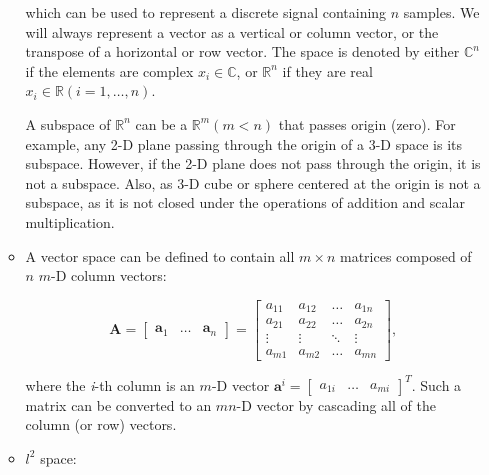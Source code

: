 \documentclass[10pt,b5paper,titlepage]{book}
\begin{document}
\begin{itemize}
\begin{itemize}
                which can be used to represent a discrete signal containing
                $n$ samples. We will always represent a vector as a vertical
                or column vector, or the transpose of a horizontal or row
                vector. The space is denoted by either $\mathbb{C}^{n}$ if the elements
                are complex $x_{i} \in \mathbb{C}$, or $\mathbb{R}^{n}$ if they
                are real $x_{i} \in \mathbb{R} (i = 1, \ldots, n)$.

                A subspace of $\mathbb{R}^{n}$ can be a $\mathbb{R}^{m} (m < n)$
                that passes origin (zero). For example, any 2-D plane passing
                through the origin of a 3-D space is its subspace. However, if
                the 2-D plane does not pass through the origin, it is not a subspace.
                Also, as 3-D cube or sphere centered at the origin is not a subspace,
                as it is not closed under the operations of addition and scalar
                multiplication.

            \item A vector space can be defined to contain all $m \times n$ matrices
                composed of $n$ $m$-D column vectors:

                \begin{equation}
                    \mathbf{A} = \begin{bmatrix} \mathbf{a}_1 & \ldots & \mathbf{a}_n \end{bmatrix}
                    = \begin{bmatrix}
                        a_{11} & a_{12} & \ldots & a_{1n}\\
                        a_{21} & a_{22} & \ldots & a_{2n}\\
                        \vdots & \vdots & \ddots & \vdots\\
                        a_{m1} & a_{m2} & \ldots & a_{mn}
                    \end{bmatrix}
                ,\end{equation}

                where the \textit{i}-th column is an  $m$-D vector
                $\mathbf{a}^{i} = \begin{bmatrix} a_{1i} & \ldots & a_{mi} \end{bmatrix}^{T}$.
                Such a matrix can be converted to an $mn$-D vector by cascading all of the column
                (or row) vectors.

            \item  $l^{2}$ space:


\end{itemize}
\end{itemize}
\end{document}
